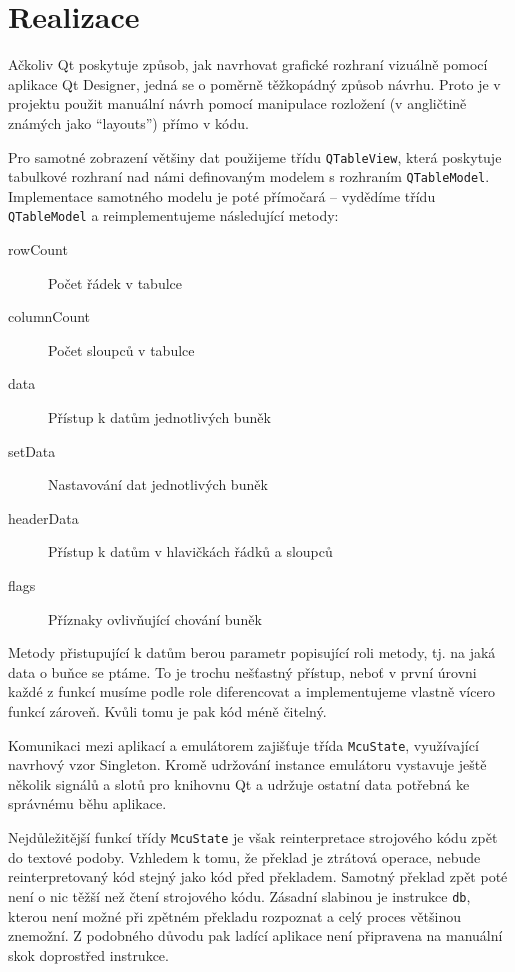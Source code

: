 \section{Realizace}

Ačkoliv Qt poskytuje způsob, jak navrhovat grafické rozhraní vizuálně pomocí aplikace Qt Designer\cite{qt-designer}, jedná se o poměrně těžkopádný způsob návrhu. Proto je v projektu použit manuální návrh pomocí manipulace rozložení (v angličtině známých jako ``layouts'') přímo v kódu.

Pro samotné zobrazení většiny dat použijeme třídu \texttt{QTableView}, která poskytuje tabulkové rozhraní nad námi definovaným modelem s rozhraním \texttt{QTableModel}. Implementace samotného modelu je poté přímočará -- vydědíme třídu \texttt{QTableModel} a reimplementujeme následující metody:

\begin{description}
	\item[rowCount] Počet řádek v tabulce
	\item[columnCount] Počet sloupců v tabulce
	\item[data] Přístup k datům jednotlivých buněk
	\item[setData] Nastavování dat jednotlivých buněk
	\item[headerData] Přístup k datům v hlavičkách řádků a sloupců
	\item[flags] Příznaky ovlivňující chování buněk
\end{description}

Metody přistupující k datům berou parametr popisující roli metody, tj. na jaká data o buňce se ptáme. To je trochu nešťastný přístup, neboť v první úrovni každé z funkcí musíme podle role diferencovat a implementujeme vlastně vícero funkcí zároveň. Kvůli tomu je pak kód méně čitelný.


Komunikaci mezi aplikací a emulátorem zajišťuje třída \texttt{McuState}, využívající navrhový vzor Singleton\cite{gof}. Kromě udržování instance emulátoru vystavuje ještě několik signálů a slotů pro knihovnu Qt a udržuje ostatní data potřebná ke správnému běhu aplikace.

Nejdůležitější funkcí třídy \texttt{McuState} je však reinterpretace strojového kódu zpět do textové podoby. Vzhledem k tomu, že překlad je ztrátová operace, nebude reinterpretovaný kód stejný jako kód před překladem. Samotný překlad zpět poté není o nic těžší než čtení strojového kódu. Zásadní slabinou je instrukce \texttt{db}, kterou není možné při zpětném překladu rozpoznat a celý proces většinou znemožní. Z podobného důvodu pak ladící aplikace není připravena na manuální skok doprostřed instrukce.


